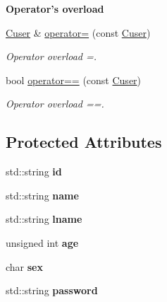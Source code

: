 \begin{Indent}{\bf Operator's overload}\par
\begin{DoxyCompactItemize}
\item 
\hyperlink{class_cuser}{Cuser} \& \hyperlink{class_cuser_aef852c28290d89b9b5ce337e2efc8402}{operator=} (const \hyperlink{class_cuser}{Cuser})
\begin{DoxyCompactList}\small\item\em Operator overload =. \end{DoxyCompactList}\item 
bool \hyperlink{class_cuser_aef7e5bb5e3100340f137c9d4e737303f}{operator==} (const \hyperlink{class_cuser}{Cuser})
\begin{DoxyCompactList}\small\item\em Operator overload ==. \end{DoxyCompactList}\end{DoxyCompactItemize}
\end{Indent}
\subsection*{Protected Attributes}
\begin{DoxyCompactItemize}
\item 
\hypertarget{class_cuser_ad45513c28dc1bedea1a2a70492268a24}{std\+::string {\bfseries id}}\label{class_cuser_ad45513c28dc1bedea1a2a70492268a24}

\item 
\hypertarget{class_cuser_af613b8519da5db9e6507efe2f663c93b}{std\+::string {\bfseries name}}\label{class_cuser_af613b8519da5db9e6507efe2f663c93b}

\item 
\hypertarget{class_cuser_a64c011e9e582e72b4011da3c0c8c708e}{std\+::string {\bfseries lname}}\label{class_cuser_a64c011e9e582e72b4011da3c0c8c708e}

\item 
\hypertarget{class_cuser_a6ef9948f9811b0f5e999fc6c22ee0417}{unsigned int {\bfseries age}}\label{class_cuser_a6ef9948f9811b0f5e999fc6c22ee0417}

\item 
\hypertarget{class_cuser_af54739b0bf4bd2c8b478fe58b2b9dac2}{char {\bfseries sex}}\label{class_cuser_af54739b0bf4bd2c8b478fe58b2b9dac2}

\item 
\hypertarget{class_cuser_a5bc33eddbc8eed0a02decea81e9bb2ae}{std\+::string {\bfseries password}}\label{class_cuser_a5bc33eddbc8eed0a02decea81e9bb2ae}

\end{DoxyCompactItemize}


